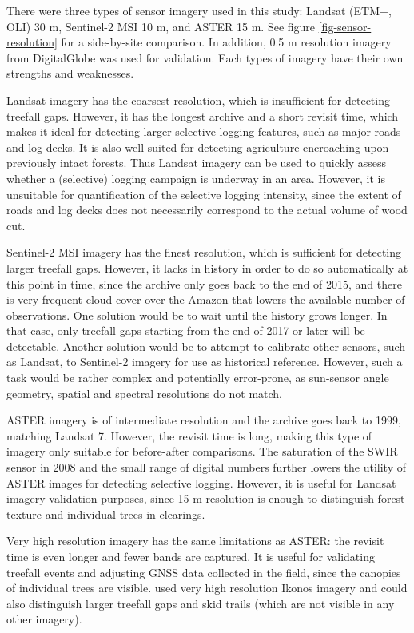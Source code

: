 \documentclass[a4paper,12pt]{scrbook}
\begin{document}
There were three types of sensor imagery used in this study: Landsat (\ac{ETM+}, \ac{OLI}) 30 m, Sentinel-2 \ac{MSI} 10 m, and \ac{ASTER} 15 m. See figure \ref{fig-sensor-resolution} for a side-by-site comparison. In addition, 0.5 m resolution imagery from DigitalGlobe was used for validation. Each types of imagery have their own strengths and weaknesses.

Landsat imagery has the coarsest resolution, which is insufficient for detecting treefall gaps. However, it has the longest archive and a short revisit time, which makes it ideal for detecting larger selective logging features, such as major roads and log decks. It is also well suited for detecting agriculture encroaching upon previously intact forests. Thus Landsat imagery can be used to quickly assess whether a (selective) logging campaign is underway in an area. However, it is unsuitable for quantification of the selective logging intensity, since the extent of roads and log decks does not necessarily correspond to the actual volume of wood cut.

Sentinel-2 \ac{MSI} imagery has the finest resolution, which is sufficient for detecting larger treefall gaps. However, it lacks in history in order to do so automatically at this point in time, since the archive only goes back to the end of 2015, and there is very frequent cloud cover over the Amazon that lowers the available number of observations. One solution would be to wait until the history grows longer. In that case, only treefall gaps starting from the end of 2017 or later will be detectable. Another solution would be to attempt to calibrate other sensors, such as Landsat, to Sentinel-2 imagery for use as historical reference. However, such a task would be rather complex and potentially error-prone, as sun-sensor angle geometry, spatial and spectral resolutions do not match.

\ac{ASTER} imagery is of intermediate resolution and the archive goes back to 1999, matching Landsat 7. However, the revisit time is long, making this type of imagery only suitable for before-after comparisons. The saturation of the \ac{SWIR} sensor in 2008 and the small range of digital numbers further lowers the utility of \ac{ASTER} images for detecting selective logging. However, it is useful for Landsat imagery validation purposes, since 15 m resolution is enough to distinguish forest texture and individual trees in clearings.

Very high resolution imagery has the same limitations as \ac{ASTER}: the revisit time is even longer and fewer bands are captured. It is useful for validating treefall events and adjusting \ac{GNSS} data collected in the field, since the canopies of individual trees are visible. \citet{read_spatial_2003} used very high resolution Ikonos imagery and could also distinguish larger treefall gaps and skid trails (which are not visible in any other imagery).
\end{document}
